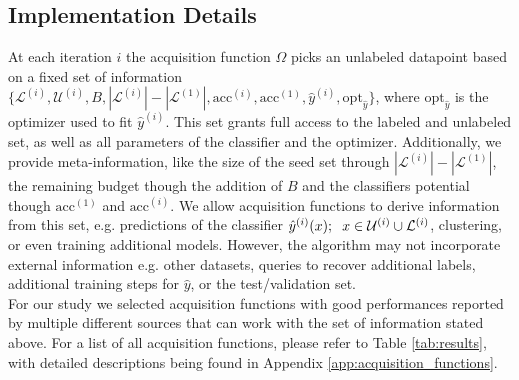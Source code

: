 \documentclass[]{article}
\begin{document}
\subsection{Implementation Details}\label{sec:implementation_details}
At each iteration $i$ the acquisition function $\Omega$ picks an unlabeled datapoint based on a fixed set of information $\{\mathcal{L}^{(i)}, \mathcal{U}^{(i)}, B, |\mathcal{L}^{(i)}|-|\mathcal{L}^{(1)}|, \text{acc}^{(i)}, \text{acc}^{(1)}, \hat y^{(i)}, \text{opt}_{\hat y}\}$, where $\text{opt}_{\hat y}$ is the optimizer used to fit $\hat y^{(i)}$.
This set grants full access to the labeled and unlabeled set, as well as all parameters of the classifier and the optimizer.
Additionally, we provide meta-information, like the size of the seed set through $|\mathcal{L}^{(i)}|-|\mathcal{L}^{(1)}|$, the remaining budget though the addition of $B$ and the classifiers potential though $\text{acc}^{(1)}$ and $\text{acc}^{(i)}$.
We allow acquisition functions to derive information from this set, e.g. predictions of the classifier $\hat y^{(i)}(x); \hspace{2mm} x \in \mathcal{U}^{(i)} \cup \mathcal{L}^{(i)}$, clustering, or even training additional models.
However, the algorithm may not incorporate external information e.g. other datasets, queries to recover additional labels, additional training steps for $\hat y$, or the test/validation set. \\
For our study we selected acquisition functions with good performances reported by multiple different sources that can work with the set of information stated above.
For a list of all acquisition functions, please refer to Table \ref{tab:results}, with detailed descriptions being found in Appendix \ref{app:acquisition_functions}. \\ [1mm]
%

\end{document}
